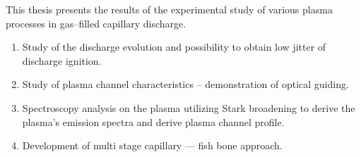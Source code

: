 \documentclass[../main.tex]{subfiles}
\begin{document}
This thesis presents the results of the experimental study of various plasma processes in gas--filled capillary discharge.
\begin{enumerate}
  \item Study of the discharge evolution and possibility to obtain low jitter of discharge ignition.
  \item Study of plasma channel characteristics -- demonstration of optical guiding.
  \item Spectroscopy analysis on the plasma utilizing Stark broadening to derive the plasma's emission spectra and derive plasma channel profile.
  \item Development of multi stage capillary --- fish bone approach.
\end{enumerate}
\end{document}
